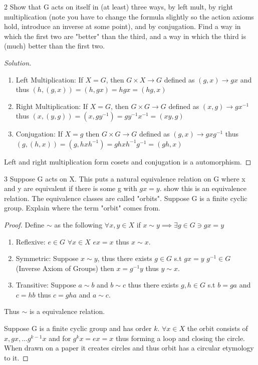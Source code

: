 \documentclass{article}
\newenvironment{solution}
{\renewcommand\qedsymbol{$\blacksquare$}\begin{proof}[Solution]}
{\end{proof}}
\begin{document}
\bigskip

\begin{PROB}{2}\label{Problem 2.}
    Show that G acts on itself in (at least) three ways, by left mult, by right multiplication (note you have to change the formula slightly so the action axioms hold, introduce an inverse at some point), and by conjugation.  Find a way in which the first two are "better" than the third, and a way in which the third is (much) better than the first two.
\end{PROB}
\begin{solution}
    \begin{enumerate}{}
        \item Left Multiplication: If $X = G$, then $G \times X \to G$ defined as $(g, x) \to gx$ and thus $(h, (g, x)) = (h, gx) = hgx = (hg, x)$
        \item Right Multiplication: If $X = G$, then $G \times G \to G$ defined as $(x, g) \to gx^{-1}$ thus $(x, (y, g)) = (x, gy^{-1}) = gy^{-1}x^{-1} = (xy ,g)$
        \item Conjugation: If $X = g$ then $G \times G \to G$ defined as $(g, x) \to gxg^{-1}$ thus $(g, (h, x)) = (g, hxh^{-1}) = ghxh^{-1}g^{-1} = (gh, x)$
    \end{enumerate}

    Left and right multiplication form cosets and conjugation is a automorphism.
\end{solution}

\bigskip

\begin{PROB}{3}\label{Problem 3.}
    Suppose G acts on X. This puts a natural equivalence relation on G where x and y are equivalent if there is some g with $g x =y$. show this is an equivalence relation. The equivalence classes are called "orbits". Suppose G is a finite cyclic group. Explain where the term "orbit" comes from.  
\end{PROB}
\begin{proof}
    Define $\sim$ as the following $\forall x, y \in X$ if $x \sim y \implies \exists g \in G \ni gx = y$

    \begin{enumerate}{}
        \item Reflexive: $e \in G$ $\forall x \in X$ $ex = x$ thus $x \sim x$.
        \item Symmetric: Suppose $x \sim y$, thus there exists $g \in G$ s.t $gx = y$ $g^{-1} \in G$ (Inverse Axiom of Groups) then $x = g^{-1}y$ thus $y \sim x$.
        \item Transitive: Suppose $a \sim b$ and $b \sim c$ thus there exists $g, h \in G$ s.t $b = ga$ and $c = hb$ thus $c = gha$ and $a \sim c$.
    \end{enumerate}

    Thus $\sim$ is a equivalence relation.


    Suppose G is a finite cyclic group and has order $k$. $\forall x \in X$ the orbit consists of $x, gx, \ldots g^{k - 1}x$ and for $g^kx = ex = x$ thus forming a loop and closing the circle. When drawn on a paper it creates circles and thus orbit has a circular etymology to it.
\end{proof}
\end{document}
